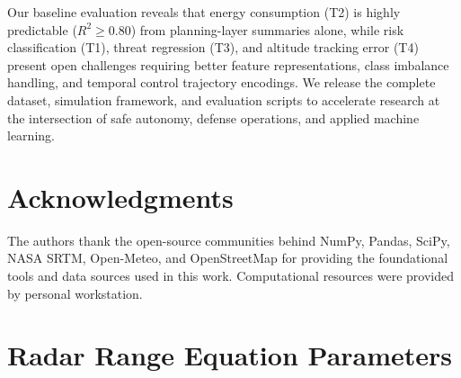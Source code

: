﻿\documentclass{article}
\begin{document}
Our baseline evaluation reveals that energy consumption (T2) is highly
predictable ($R^2 \geq 0.80$) from planning-layer summaries alone, while
risk classification (T1), threat regression (T3), and altitude tracking
error (T4) present open challenges requiring better feature representations,
class imbalance handling, and temporal control trajectory encodings.
We release the complete dataset, simulation framework, and evaluation
scripts to accelerate research at the intersection of safe autonomy,
defense operations, and applied machine learning.

\section*{Acknowledgments}

The authors thank the open-source communities behind NumPy, Pandas, SciPy,
NASA SRTM, Open-Meteo, and OpenStreetMap for providing the foundational
tools and data sources used in this work. Computational resources were
provided by personal workstation.




\appendix

\section{Radar Range Equation Parameters}
\label{app:rre_params}
\end{document}
